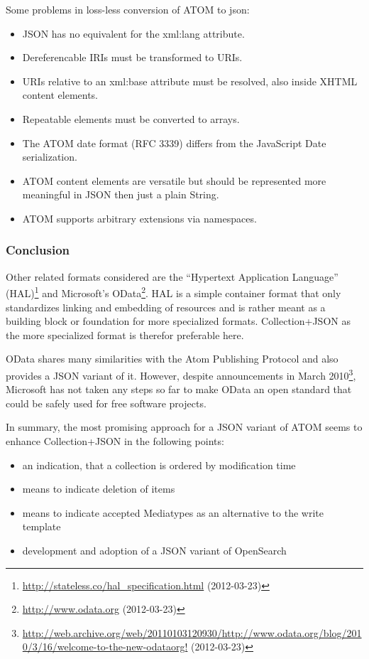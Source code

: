 \documentclass[12pt,a4paper,twoside]{scrartcl}		%
\newcommand{\citeurl}[2]{\url{#1} (#2)}
\begin{document}
Some problems in loss-less conversion of ATOM to json:\cite{Snell2008}
\begin{itemize}
  \item JSON has no equivalent for the xml:lang attribute.
  \item Dereferencable IRIs must be transformed to URIs.
  \item URIs relative to an xml:base attribute must be resolved, also inside XHTML content elements.
  \item Repeatable elements must be converted to arrays.
  \item The ATOM date format (RFC 3339) differs from the JavaScript Date serialization.
  \item ATOM content elements are versatile but should be represented more meaningful in JSON then just a plain String.
  \item ATOM supports arbitrary extensions via namespaces.
\end{itemize}

\subsubsection{Conclusion}

Other related formats considered are the ``Hypertext Application Language''
(HAL)\footnote{\citeurl{http://stateless.co/hal_specification.html}{2012-03-23}}
and Microsoft's OData\footnote{\citeurl{http://www.odata.org}{2012-03-23}}. HAL
is a simple container format that only standardizes linking and embedding of
resources and is rather meant as a building block or foundation for more
specialized formats. Collection+JSON as the more specialized format is therefor
preferable here.

OData shares many similarities with the Atom Publishing Protocol and also
provides a JSON variant of it. However, despite announcements in March
2010\footnote{\citeurl{http://web.archive.org/web/20110103120930/http://www.odata.org/blog/2010/3/16/welcome-to-the-new-odataorg!}{2012-03-23}},
Microsoft has not taken any steps so far to make OData an open standard that
could be safely used for free software projects.

In summary, the most promising approach for a JSON variant of ATOM seems to
enhance Collection+JSON in the following points:

\begin{itemize}
\item an indication, that a collection is ordered by modification time
\item means to indicate deletion of items
\item means to indicate accepted Mediatypes as an alternative to the write
  template
\item development and adoption of a JSON variant of OpenSearch
\end{itemize}
\end{document}
